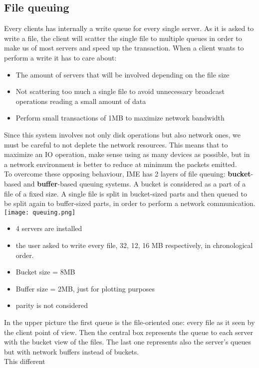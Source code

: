 \subsection{File queuing}
Every clients has internally a write queue for every single server. As it is
asked to write a file, the client will scatter the single file to multiple
queues in order to make us of most servers and speed up the transaction.
When a client wants to perform a write it has to care about:
\begin{itemize}
    \item The amount of servers that will be involved depending on the file size
    \item Not scattering too much a single file to avoid unnecessary broadcast
        operations reading a small amount of data
    \item Perform small transactions of 1MB to maximize network bandwidth
\end{itemize}
Since this system involves not only disk operations but also network ones, we
must be careful to not deplete the network resources. This means that to
maximize an IO operation, make sense using as many devices as possible, but in
a network environment is better to reduce at minimum the packets emitted. \\ To
overcome these opposing behaviour, IME has 2 layers of file queuing:
\textbf{bucket}-based and \textbf{buffer}-based queuing systems.  A bucket is
considered as a part of a file of a fixed size. A single file is split in
bucket-sized parts and then queued to be split again to buffer-sized parts, in
order to perform a network communication.
\texttt{[image: queuing.png]}
\begin{itemize}
    \item 4 servers are installed
    \item the user asked to write every file, 32, 12, 16 MB respectively, in
        chronological order.
    \item Bucket size = 8MB
    \item Buffer size = 2MB, just for plotting purposes
    \item parity is not considered
\end{itemize}
In the upper picture the first queue is the file-oriented one: every file as it seen
by the client point of view.  Then the central box represents the queue to each
server with the bucket view of the files.  The last one represents also the
server's queues but with network buffers instead of buckets. \\ This different
